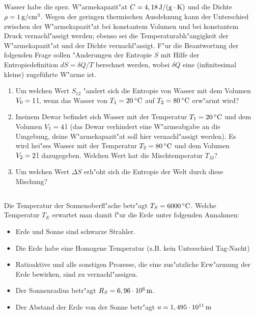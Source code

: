 \documentclass[twoside,colorbacktitle,accentcolor=tud0b]{tudexercise}
\newcommand{\unit}[1]{{\rm\,#1}}
\begin{document}
  \subsection{}
    Wasser habe die spez. W"armekapazit"at $C=4,18\unit{J/(g\cdot K)}$ und die Dichte
    $\rho=1\unit{g/cm^3}$. Wegen der geringen thermischen Ausdehnung kann der Unterschied zwischen
    der W"armekapazit"at bei konstantem Volumen und bei konstantem Druck vernachl"assigt werden;
    ebenso sei die Temperaturabh"angigkeit der W"armekapazit"at und der Dichte vernachl"assigt.
    F"ur die Beantwortung der folgenden Frage sollen "Anderungen der Entropie $S$ mit Hilfe der
    Entropiedefinition $dS=\delta Q/T$ berechnet werden, wobei $\delta Q$ eine (infinitesimal
    kleine) zugeführte W"arme ist.
    \begin{enumerate}
      \item Um welchen Wert $S_{12}$ "andert sich die Entropie von Wasser mit dem Volumen
      $V_0=1\unit{l}$, wenn das Wasser von $T_1=20\unit{^\circ C}$ auf $T_2=80\unit{^\circ C}$
      erw"armt wird?
      \item Ineinem Dewar befindet sich Wasser mit der Temperatur $T_1=20\unit{^\circ C}$ und dem
      Volumen $V_1=4\unit{l}$ (das Dewar verhindert eine W"armeabgabe an die Umgebung, deine
      W"armekapazit"at soll hier vernachl"assigt werden). Es wird hei"ses Wasser mit der
      Temperatur $T_2=80\unit{^\circ C}$ und dem Volumen $V_2=2\unit{l}$ dazugegeben. Welchen Wert
      hat die Mischtemperatur $T_M$?
      \item Um welchen Wert $\Delta S$ erh"oht sich die Entropie der Welt durch diese Mischung?
    \end{enumerate}
\clearpage
  \subsection{}
    Die Temperatur der Sonnenoberfl"ache betr"agt $T_S=6000\unit{^\circ C}$. Welche Temperatur
    $T_E$ erwartet man damit f"ur die Erde unter folgenden Annahmen:
    \begin{itemize}
      \item Erde und Sonne sind schwarze Strahler.
      \item Die Erde habe eine Homogene Temperatur (z.B. kein Unterschied Tag-Nacht)
      \item Ratioaktive und alle sonstigen Prozesse, die eine zus"atzliche Erw"armung der Erde
      bewirken, sind zu vernachl"assigen.
      \item Der Sonnenradius betr"agt $R_S=6,96\cdot10^6\unit{m}$.
      \item Der Abstand der Erde von der Sonne betr"agt $a=1,495\cdot10^{11}\unit{m}$
    \end{itemize}
\end{document}
